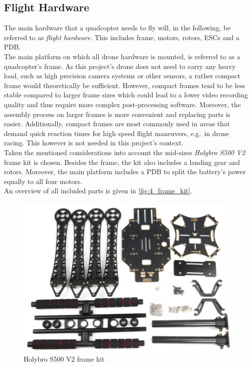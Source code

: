 \subsection*{Flight Hardware}\label{subsec:4_filght_hardware}
The main hardware that a quadcopter needs to fly will, in the following, be
referred to as \textit{flight hardware}.
This includes frame, motors, rotors, \acp{ESC} and a \ac{PDB}.\\
The main platform on which all drone hardware is mounted, is referred to as
a quadcopter's frame.
As this project's drone does not need to carry any heavy load, such as high 
precision camera systems or other sensors, a rather compact frame would 
theoretically be sufficient.
However, compact frames tend to be less stable compared to larger frame sizes 
which could lead to a lower video recording quality and thus require more 
complex post-processing software.
Moreover, the assembly process on larger frames is more convenient and 
replacing parts is easier.
Additionally, compact frames are most commonly used in areas that demand quick
reaction times for high speed flight maneuvers, e.g.~in drone racing.
This however is not needed in this project's context.\\
Taken the mentioned considerations into account the mid-sizes \textit{Holybro 
S500 V2} frame kit is chosen.
Besides the frame, the kit also includes a landing gear and rotors.
Moreover, the main platform includes a \ac{PDB} to split the battery's power 
equally to all four motors.\\
An overview of all included parts is given in \autoref{fig:4_frame_kit}.
\begin{figure}[!h]
    \centering
    \includegraphics[scale=0.6]{frame-kit.png}
    \caption[Frame kit]{Holybro S500 V2 frame kit}
    \label{fig:4_frame_kit}
\end{figure}
